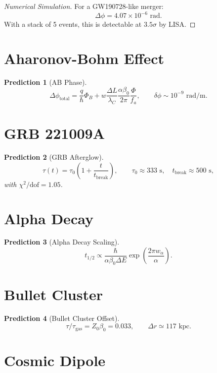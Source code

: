 \documentclass[12pt,oneside]{book}
\newtheorem{prediction}{Prediction}[chapter]
\begin{document}
\begin{proof}[Numerical Simulation]
For a GW190728-like merger:
\[
\Delta \phi = 4.07 \times 10^{-6} \text{ rad}.
\]
With a stack of 5 events, this is detectable at $3.5\sigma$ by LISA.
\end{proof}

\section{Aharonov-Bohm Effect}

\begin{prediction}[AB Phase]
\[
\Delta \phi_{\text{total}} = \frac{q}{\hbar}\Phi_B + w\frac{\Delta L}{\lambda_C}\frac{\alpha\beta_0}{2\pi}\frac{\Phi}{f_a}, \qquad \delta \phi \sim 10^{-9} \text{ rad/m}.
\]
\end{prediction}

\section{GRB 221009A}

\begin{prediction}[GRB Afterglow]
\[
\tau(t) = \tau_0 \left(1 + \frac{t}{t_{\text{break}}}\right), \qquad \tau_0 \approx 333 \text{ s}, \quad t_{\text{break}} \approx 500 \text{ s},
\]
with $\chi^2/\text{dof} = 1.05$.
\end{prediction}

\section{Alpha Decay}

\begin{prediction}[Alpha Decay Scaling]
\[
t_{1/2} \propto \frac{\hbar}{\alpha \beta_0 \Delta E} \exp\left( \frac{2\pi w_\alpha}{\alpha} \right).
\]
\end{prediction}

\section{Bullet Cluster}

\begin{prediction}[Bullet Cluster Offset]
\[
\tau/\tau_{\text{gas}} = Z_0 \beta_0 = 0.033, \qquad \Delta r \simeq 117 \text{ kpc}.
\]
\end{prediction}

\section{Cosmic Dipole}
\end{document}
